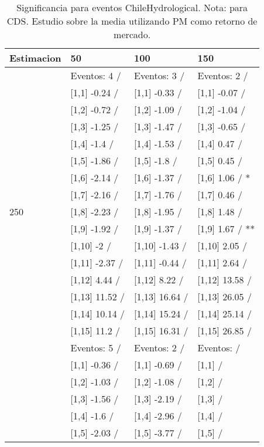 \begin{table}

\caption{Significancia para eventos ChileHydrological. Nota: para CDS. Estudio sobre la media utilizando PM como retorno de mercado.}
\centering
\begin{tabular}[t]{llll}
\toprule
Estimacion & 50 & 100 & 150\\
\midrule
 & Eventos:  4 / & Eventos:  3 / & Eventos:  2 /\\
 & {}[1,1] -0.24  / & {}[1,1] -0.33  / & {}[1,1] -0.07  /\\
 & {}[1,2] -0.72  / & {}[1,2] -1.09  / & {}[1,2] -1.04  /\\
 & {}[1,3] -1.25  / & {}[1,3] -1.47  / & {}[1,3] -0.65  /\\
 & {}[1,4] -1.4  / & {}[1,4] -1.53  / & {}[1,4] 0.47  /\\
\addlinespace
 & {}[1,5] -1.86  / & {}[1,5] -1.8  / & {}[1,5] 0.45  /\\
 & {}[1,6] -2.14  / & {}[1,6] -1.37  / & {}[1,6] 1.06  / *\\
 & {}[1,7] -2.16  / & {}[1,7] -1.76  / & {}[1,7] 0.46  /\\
250 & {}[1,8] -2.23  / & {}[1,8] -1.95  / & {}[1,8] 1.48  /\\
 & {}[1,9] -1.92  / & {}[1,9] -1.37  / & {}[1,9] 1.67  / **\\
\addlinespace
 & {}[1,10] -2  / & {}[1,10] -1.43  / & {}[1,10] 2.05  /\\
 & {}[1,11] -2.37  / & {}[1,11] -0.44  / & {}[1,11] 2.64  /\\
 & {}[1,12] 4.44  / & {}[1,12] 8.22  / & {}[1,12] 13.58  /\\
 & {}[1,13] 11.52  / & {}[1,13] 16.64  / & {}[1,13] 26.05  /\\
 & {}[1,14] 10.14  / & {}[1,14] 15.24  / & {}[1,14] 25.14  /\\
\addlinespace
 & {}[1,15] 11.2  / & {}[1,15] 16.31  / & {}[1,15] 26.85  /\\
 & Eventos:  5 / & Eventos:  2 / & Eventos:   /\\
 & {}[1,1] -0.36  / & {}[1,1] -0.69  / & {}[1,1]  /\\
 & {}[1,2] -1.03  / & {}[1,2] -1.08  / & {}[1,2]  /\\
 & {}[1,3] -1.56  / & {}[1,3] -2.19  / & {}[1,3]  /\\
\addlinespace
 & {}[1,4] -1.6  / & {}[1,4] -2.96  / & {}[1,4]  /\\
 & {}[1,5] -2.03  / & {}[1,5] -3.77  / & {}[1,5]  /\\

\end{tabular}
\end{table}
